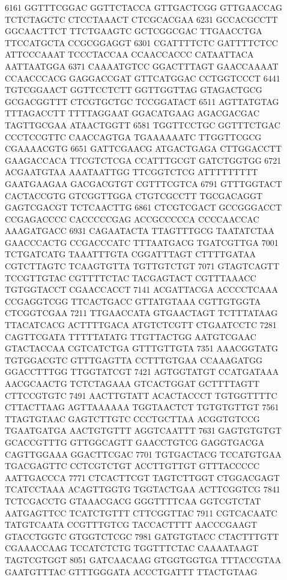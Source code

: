 \begin{addmargin}{0.025\textwidth}
\begin{footnotesize}
\begin{LVerbatim}[commandchars=\\\{\}]
\color{red}6161 GGTTTCGGAC GGTTCTACCA GTTGACTCGG GTTGAACCAG TCTCTAGCTC CTCCTAAACT CTCGCACGAA
\color{red}6231 GCCACGCCTT GGCAACTTCT TTCTGAAGTC GCTCGGCGAC TTGAACCTGA TTCCATGCTA CCGCGGAGGT
\color{red}6301 CGATTTTCTC GATTTTCTCC ATTCCCAAAT TCCCTACCAA CCAACCACCC CATAATTACA AATTAATGGA
\color{red}6371 CAAAATGTCC GGACTTTAGT GAACCAAAAT CCAACCCACG GAGGACCGAT GTTCATGGAC CCTGGTCCCT
\color{red}6441 TGTCGGAACT GGTTCCTCTT GGTTGGTTAG GTAGACTGCG GCGACGGTTT CTCGTGCTGC TCCGGATACT
\color{red}6511 AGTTATGTAG TTTAGACCTT TTTTAGGAAT GGACATGAAG AGACGACGAC TAGTTGCGAA ATAACTGGTT
\color{red}6581 TGGTTCCTGC GGTTTCTGAC CCCTCCGTTC CAACCAGTGA TGAAAAAATC TTGGTTCGCG CGAAAACGTG
\color{red}6651 GATTCGAACG ATGACTGAGA CTTGGACCTT GAAGACCACA TTCGTCTCGA CCATTTGCGT GATCTGGTGG
\color{red}6721 ACGAATGTAA AAATAATTGG TTCGGTCTCG ATTTTTTTTT GAATGAAGAA GACGACGTGT CGTTTCGTCA
\color{red}6791 GTTTGGTACT CACTACCGTG GTCGGTTGGA CTGTCGCCTT TGCGACAGGT GAGTCGACGT TCTCAACTTG
\color{red}6861 CTCGTCGACT GCCGGGACCT CCGAGACCCC CACCCCCGAG ACCGCCCCCA CCCCAACCAC AAAGATGACC
\color{red}6931 CAGAATACTA TTAGTTTGCG TAATATCTAA GAACCCACTG CCGACCCATC TTTAATGACG TGATCGTTGA
\color{red}7001 TCTGATCATG TAAATTTGTA CGGATTTAGT CTTTTGATAA CGTCTTAGTC TCAAGTGTTA TGTTGTCTGT
\color{red}7071 GTAGTCAGTT TCCGTTGTAC CGTTTTCTAC TACGAGTACT CGTTTAAACC TGTGGTACCT CGAACCACCT
\color{red}7141 ACGATTACGA ACCCCTCAAA CCGAGGTCGG TTCACTGACC GTTATGTAAA CGTTGTGGTA CTCGGTCGAA
\color{red}7211 TTGAACCATA GTGAACTAGT TCTTTATAAG TTACATCACG ACTTTTGACA ATGTCTCGTT CTGAATCCTC
\color{red}7281 CAGTTCGATA TTTTTATATG TTGTTACTGG AATGTCGAAC GTACTACCAA CGTCATCTGA GTTTGTTGTA
\color{red}7351 AAACGGTATG TGTGGACGTC GTTTGAGTTA CCTTTGTGAA CCAAAGATGG GGACCTTTGG TTGGTATCGT
\color{red}7421 AGTGGTATGT CCATGATAAA AACGCAACTG TCTCTAGAAA GTCACTGGAT GCTTTTAGTT CTTCCGTGTC
\color{red}7491 AACTTGTATT ACACTACCCT TGTGGTTTTC CTTACTTAAG AGTTAAAAAA TGGTAACTCT TGTGTGTTGT
\color{red}7561 TTAGTGTAAC GAGTCTTGTC CCCTGCTTAA ACGGTGTCCG TGAATGATGA AACTGTGTTT AGGTCAATTT
\color{red}7631 GAGTGTGTGT GCACCGTTTG GTTGGCAGTT GAACCTGTCG GAGGTGACGA CAGTTGGAAA GGACTTCGAC
\color{red}7701 TGTGACTACG TCCATGTGAA TGACGAGTTC CCTCGTCTGT ACCTTGTTGT GTTTACCCCC AATTGACCCA
\color{red}7771 CTCACTTCGT TAGTCTTGGT CTGGACGAGT TCATCCTAAA ACAGTTGGTG TGGTACTGAA ACTTCGGTCG
\color{red}7841 TCTCGACCTG GTAAACGACG GGGTTTTCAA GGTCGTCTAT AATGAGTTCC TCATCTGTTT CTTCGGTTAC
\color{red}7911 CGTCACAATC TATGTCAATA CCGTTTGTCG TACCACTTTT AACCCGAAGT GTACCTGGTC GTGGTCTCGC
\color{red}7981 GATGTGTACC CTACTTTGTT CGAAACCAAG TCCATCTCTG TGGTTTCTAC CAAAATAAGT TAGTCGTGGT
\color{red}8051 GATCAACAAG GTGGTGGTGA TTTACCGTAA GAATGTTTAC GTTTGGGATA ACCCTGATTT TTACTGTAAG

\end{LVerbatim}
\end{footnotesize}
\end{addmargin}
